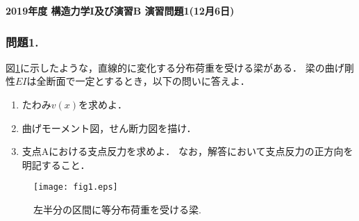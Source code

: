 \documentclass[10pt,a4j]{jarticle}
\newlength{\minitwocolumn}
\begin{document}
\newcommand{\fat}[1]{\mbox{\boldmath $#1$}}
\newcommand{\D}{\partial}
\newcommand{\w}{\omega}
\newcommand{\ga}{\alpha}
\newcommand{\gb}{\beta}
\newcommand{\gx}{\xi}
\newcommand{\gz}{\zeta}
\newcommand{\vhat}[1]{\hat{\fat{#1}}}
\newcommand{\spc}{\vspace{0.7\baselineskip}}
\newcommand{\halfspc}{\vspace{0.3\baselineskip}}

\pagestyle{empty}
\newcommand{\twofig}[2]
 {
   \begin{figure}[h]
     \begin{minipage}[t]{\minitwocolumn}
         \begin{center}   #1
         \end{center}
     \end{minipage}
         \hspace{\columnsep}
     \begin{minipage}[t]{\minitwocolumn}
         \begin{center} #2
         \end{center}
     \end{minipage}
   \end{figure}
 }
\begin{center}
{\Large \bf 2019年度 構造力学I及び演習B 演習問題1(12月6日)} \\
\end{center}
\subsubsection*{問題1. }
図\ref{fig:fig1}に示したような，直線的に変化する分布荷重を受ける梁がある．
梁の曲げ剛性$EI$は全断面で一定とするとき，以下の問いに答えよ．
\begin{enumerate}
\item
	たわみ$v(x)$を求めよ．
\item
	曲げモーメント図，せん断力図を描け．
\item
	支点Aにおける支点反力を求めよ．
	なお，解答において支点反力の正方向を明記すること．
\end{enumerate}
\begin{figure}[h]
	\begin{center}
	\texttt{[image: fig1.eps]} 
	\end{center}
	\vspace{-5mm}
	\caption{左半分の区間に等分布荷重を受ける梁.}
	\label{fig:fig1}
\end{figure}
\end{document}
